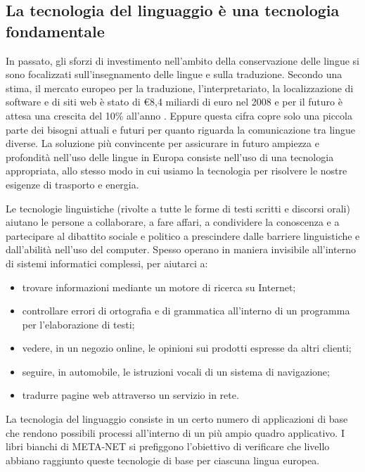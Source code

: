 \documentclass[]{../../metanetpaper}
\begin{document}
\begin{multicols}{2}
\subsection{La tecnologia del linguaggio \`{e} una tecnologia fondamentale}

In passato, gli sforzi di investimento nell'ambito della conservazione delle
lingue si sono focalizzati sull'insegnamento delle lingue e sulla
traduzione. Secondo una stima, il mercato europeo per la traduzione,
l'interpretariato, la localizzazione di software e di siti web \`{e} stato di
€8,4 miliardi di euro nel 2008 e per il futuro \`{e} attesa una crescita del
10\% all'anno \cite{EC3}. Eppure questa cifra copre solo una piccola parte dei
bisogni attuali e futuri per quanto riguarda la comunicazione tra lingue
diverse. La soluzione pi\`{u} convincente per assicurare in futuro ampiezza e
profondit\`{a} nell'uso delle lingue in Europa consiste nell'uso di una
tecnologia appropriata, allo stesso modo in cui usiamo la tecnologia per
risolvere le nostre esigenze di trasporto e energia.

Le tecnologie linguistiche (rivolte a tutte le forme di testi scritti e
discorsi orali) aiutano le persone a collaborare, a fare affari, a condividere
la conoscenza e a partecipare al dibattito sociale e politico a prescindere
dalle barriere linguistiche e dall'abilit\`{a} nell'uso del computer. Spesso
operano in maniera invisibile all'interno di sistemi informatici complessi,
per aiutarci a:


\begin{itemize}
\item trovare informazioni mediante un motore di ricerca su Internet;
\item controllare errori di ortografia e di grammatica all'interno di un programma per l'elaborazione di testi;
\item vedere, in un negozio online, le opinioni sui prodotti espresse da altri
  clienti;
\item seguire, in automobile, le istruzioni vocali di un sistema di navigazione;
\item tradurre pagine web attraverso un servizio in rete. 
\end{itemize}

La tecnologia del linguaggio consiste in un certo numero di applicazioni di
base che rendono possibili processi all'interno di un pi\`{u} ampio quadro
applicativo. I libri bianchi di META-NET si prefiggono l'obiettivo di
verificare che livello abbiano raggiunto queste tecnologie di base per
ciascuna lingua europea.



\end{multicols}
\end{document}
